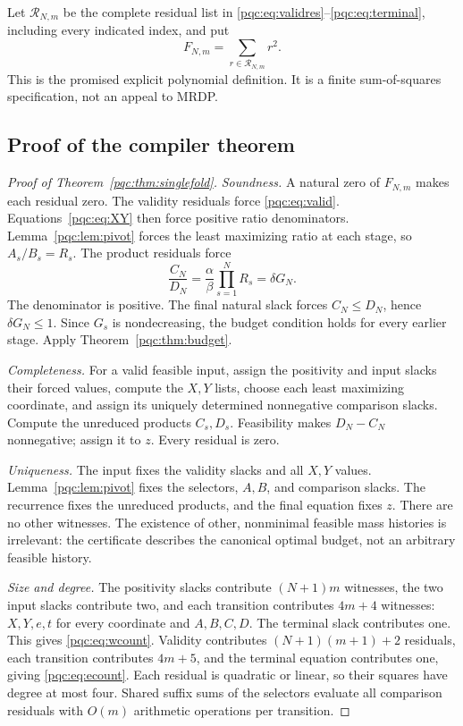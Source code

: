 \documentclass[11pt,letterpaper]{article}
\numberwithin{equation}{section}
\theoremstyle{definition}
\theoremstyle{remark}
\begin{document}
Let $\mathcal R_{N,m}$ be the complete residual list in
\eqref{pqc:eq:validres}--\eqref{pqc:eq:terminal}, including every indicated index, and
put
\begin{equation}\label{pqc:eq:F}
 F_{N,m}=\sum_{r\in\mathcal R_{N,m}}r^2.
\end{equation}
This is the promised explicit polynomial definition. It is a finite
sum-of-squares specification, not an appeal to MRDP.

\subsection{Proof of the compiler theorem}
\begin{proof}[Proof of Theorem~\ref{pqc:thm:singlefold}]
\emph{Soundness.} A natural zero of $F_{N,m}$ makes each residual zero.
The validity residuals force \eqref{pqc:eq:valid}. Equations~\eqref{pqc:eq:XY}
then force positive ratio denominators. Lemma~\ref{pqc:lem:pivot} forces the
least maximizing ratio at each stage, so $A_s/B_s=R_s$.
The product residuals force
\[
 \frac{C_N}{D_N}=\frac{\alpha}{\beta}\prod_{s=1}^N R_s
 =\delta G_N.
\]
The denominator is positive. The final natural slack forces
$C_N\le D_N$, hence $\delta G_N\le1$. Since $G_s$ is nondecreasing, the
budget condition holds for every earlier stage. Apply
Theorem~\ref{pqc:thm:budget}.

\emph{Completeness.} For a valid feasible input, assign the positivity and
input slacks their forced values, compute the $X,Y$ lists, choose each
least maximizing coordinate, and assign its uniquely determined nonnegative
comparison slacks. Compute the unreduced products $C_s,D_s$. Feasibility
makes $D_N-C_N$ nonnegative; assign it to $z$. Every residual is zero.

\emph{Uniqueness.} The input fixes the validity slacks and all $X,Y$ values.
Lemma~\ref{pqc:lem:pivot} fixes the selectors, $A,B$, and comparison slacks.
The recurrence fixes the unreduced products, and the final equation fixes
$z$. There are no other witnesses. The existence of other, nonminimal
feasible mass histories is irrelevant: the certificate describes the
canonical optimal budget, not an arbitrary feasible history.

\emph{Size and degree.} The positivity slacks contribute $(N+1)m$ witnesses,
the two input slacks contribute two, and each transition contributes
$4m+4$ witnesses: $X,Y,e,t$ for every coordinate and $A,B,C,D$.
The terminal slack contributes one. This gives \eqref{pqc:eq:wcount}.
Validity contributes $(N+1)(m+1)+2$ residuals, each transition contributes
$4m+5$, and the terminal equation contributes one, giving
\eqref{pqc:eq:ecount}. Each residual is quadratic or linear, so their squares
have degree at most four. Shared suffix sums of the selectors evaluate all
comparison residuals with $O(m)$ arithmetic operations per transition.
\end{proof}
\end{document}
